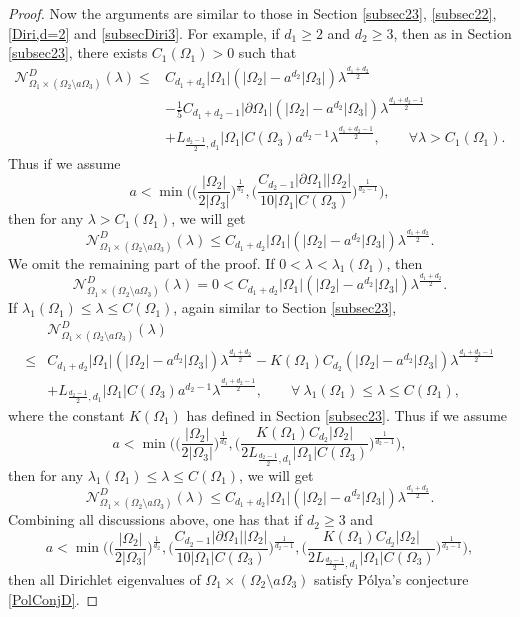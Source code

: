 \documentclass[11pt,letterpaper]{amsart}
\numberwithin{equation}{section}
\theoremstyle{plain}
\theoremstyle{plain}
\numberwithin{equation}{section}
\theoremstyle{remark}
\begin{document}
\begin{proof}
	Now the arguments are similar to those in Section \ref{subsec23}, \ref{subsec22}, \ref{Diri,d=2} and \ref{subsecDiri3}. For example, if  $d_1\ge 2$ and $d_2\ge 3$, then as in Section \ref{subsec23}, there exists $C_1(\Omega_1)>0$ such that 
	\[
	\begin{aligned}
		\mathcal N^D_{\Omega_1\times (\Omega_2\setminus a\Omega_3)}(\lambda) \le& C_{d_1+d_2}|\Omega_1|(|\Omega_2|-a^{d_2}|\Omega_3|)\lambda^{\frac{d_1+d_2}{2}}\\
		&-\frac{1}{5} C_{d_1+d_2-1} |\partial \Omega_1| (|\Omega_2|-a^{d_2}|\Omega_3|) \lambda^{\frac{d_1+d_2-1}{2}}\\
		&+ L_{\frac{d_2-1}{2}, d_1}|\Omega_1| C(\Omega_3)a^{d_2-1}\lambda^{\frac{d_1+d_2-1}{2}},\qquad \forall \lambda> C_1(\Omega_1).
	\end{aligned}
	\]
	Thus if we assume 
	\[
	a<\min \bigg(\big(\frac{|\Omega_2|}{2|\Omega_3|}\big)^{\frac{1}{d_2}}, \big(\frac{C_{d_2-1}|\partial \Omega_1||\Omega_2|}{10|\Omega_1|C(\Omega_3)} \big)^{\frac1 {d_2-1}}\bigg),
	\]
	then for any $\lambda> C_1(\Omega_1)$, we will get
	\[
	\mathcal N^D_{\Omega_1\times (\Omega_2\setminus a\Omega_3)}(\lambda) \le C_{d_1+d_2}|\Omega_1|(|\Omega_2|-a^{d_2}|\Omega_3|)\lambda^{\frac{d_1+d_2}{2}}.
	\]
	We omit the remaining part of the proof. 
	\iffalse
	If $0<\lambda<\lambda_1(\Omega_1)$, then 
	\[
	\mathcal N^D_{\Omega_1\times (\Omega_2\setminus a\Omega_3)}(\lambda)=0<C_{d_1+d_2}|\Omega_1|(|\Omega_2|-a^{d_2}|\Omega_3|)\lambda^{\frac{d_1+d_2}{2}}.
	\]
	If $\lambda_1(\Omega_1)\le \lambda\le C(\Omega_1)$, again similar to Section \ref{subsec23}, 
	\[
	\begin{aligned}
		&\mathcal N^D_{\Omega_1\times (\Omega_2\setminus a\Omega_3)}(\lambda)\\
		\le&C_{d_1+d_2}|\Omega_1|(|\Omega_2|-a^{d_2}|\Omega_3|)\lambda^{\frac{d_1+d_2}{2}}-K(\Omega_1)C_{d_2}(|\Omega_2|-a^{d_2}|\Omega_3|)\lambda^{\frac{d_1+d_2-1}{2}}\\
		&+ L_{\frac{d_2-1}{2}, d_1}|\Omega_1| C(\Omega_3)a^{d_2-1}\lambda^{\frac{d_1+d_2-1}{2}},\qquad \forall\  \lambda_1(\Omega_1)\le \lambda\le C(\Omega_1),
	\end{aligned}
	\]
	where the constant $K(\Omega_1)$ has defined in Section \ref{subsec23}. Thus if we assume
	\[
	a<\min \bigg(\big(\frac{|\Omega_2|}{2|\Omega_3|}\big)^{\frac{1}{d_2}}, \big( \frac{K(\Omega_1)C_{d_2}|\Omega_2|}{2L_{\frac{d_2-1}{2}, d_1}|\Omega_1| C(\Omega_3)} \big)^{\frac1 {d_2-1}} \bigg),
	\]
	then for any $ \lambda_1(\Omega_1)\le \lambda\le C(\Omega_1)$, we will get
	\[
	\mathcal N^D_{\Omega_1\times (\Omega_2\setminus a\Omega_3)}(\lambda) \le C_{d_1+d_2}|\Omega_1|(|\Omega_2|-a^{d_2}|\Omega_3|)\lambda^{\frac{d_1+d_2}{2}}.
	\]
	Combining  all discussions above, one has that if $d_2\ge 3$ and
	\[
	a< \min\bigg( \big(\frac{|\Omega_2|}{2|\Omega_3|}\big)^{\frac{1}{d_2}}, \big(\frac{C_{d_2-1}|\partial \Omega_1||\Omega_2|}{10|\Omega_1|C(\Omega_3)} \big)^{\frac1 {d_2-1}}, \big( \frac{K(\Omega_1)C_{d_2}|\Omega_2|}{2L_{\frac{d_2-1}{2}, d_1}|\Omega_1| C(\Omega_3)} \big)^{\frac1 {d_2-1}} \bigg),
	\]
	then all Dirichlet eigenvalues of $\Omega_1\times (\Omega_2\setminus a\Omega_3)$ satisfy P\'olya's conjecture \eqref{PolConjD}.
	

\end{proof}
\end{document}
